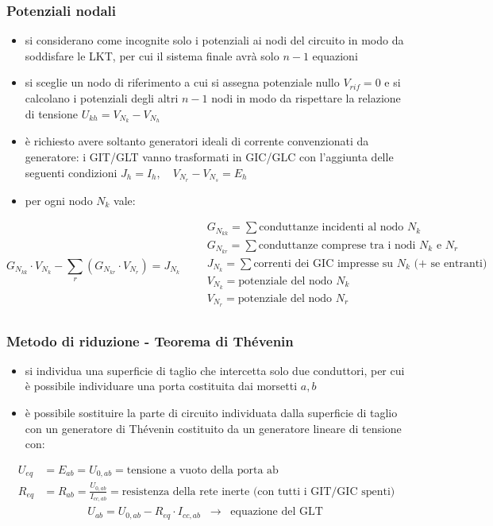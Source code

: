 \documentclass[a4paper]{article}
\begin{document}
\subsubsection*{Potenziali nodali}
\begin{itemize}
	\item si considerano come incognite solo i potenziali ai nodi del circuito in modo da soddisfare le LKT, per cui il sistema
	finale avrà solo \(n-1\) equazioni
	\item si sceglie un nodo di riferimento a cui si assegna potenziale nullo \(V_{rif} = 0\) e si calcolano i potenziali degli
	altri \(n-1\) nodi in modo da rispettare la relazione di tensione \(U_{kh} = V_{N_k}-V_{N_h}\)
	\item è richiesto avere soltanto generatori ideali di corrente convenzionati da generatore: i GIT/GLT vanno trasformati in
	GIC/GLC con l'aggiunta delle seguenti condizioni \(J_h = I_h, \quad V_{N_r}-V_{N_s} = E_h\)
	\item per ogni nodo \(N_k\) vale:
\end{itemize}
\[G_{N_{kk}} \cdot V_{N_k} - \sum_{r} (G_{N_{kr}} \cdot V_{N_r}) = J_{N_k} \qquad
\begin{array}{l}
	G_{N_{kk}} = \sum \text{conduttanze incidenti al nodo } N_k \\
	G_{N_{kr}} = \sum \text{conduttanze comprese tra i nodi } N_k \text{ e } N_r \\
	J_{N_k} = \sum \text{correnti dei GIC impresse su } N_k \text{ (+ se entranti)} \\
	V_{N_k} = \text{potenziale del nodo } N_k \\
	V_{N_r} = \text{potenziale del nodo } N_r \\
\end{array}\]

\subsubsection*{Metodo di riduzione - Teorema di Thévenin}
\begin{itemize}
	\item si individua una superficie di taglio che intercetta solo due conduttori, per cui è possibile individuare una porta 
	costituita dai morsetti \(a,b\)
	\item è possibile sostituire la parte di circuito individuata dalla superficie di taglio con un generatore di Thévenin
	costituito da un generatore lineare di tensione con:
\end{itemize}
\begin{align*}
	U_{eq} &= E_{ab} = U_{0,ab} = \text{tensione a vuoto della porta ab} \\
	R_{eq} &= R_{ab} = \frac{U_{0,ab}}{I_{cc,ab}} = \text{resistenza della rete inerte (con tutti i GIT/GIC spenti)} \\
	&\qquad\qquad U_{ab} = U_{0,ab} - R_{eq} \cdot I_{cc,ab} \;\;\rightarrow\;\; \text{equazione del GLT}
\end{align*}
\end{document}
